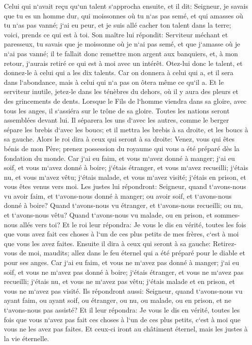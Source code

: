 \verse Celui qui n`avait reçu qu`un talent s`approcha ensuite, et il dit: Seigneur, je savais que tu es un homme dur, qui moissonnes où tu n`as pas semé, et qui amasses où tu n`as pas vanné; 
\verse j`ai eu peur, et je suis allé cacher ton talent dans la terre; voici, prends ce qui est à toi. 
\verse Son maître lui répondit: Serviteur méchant et paresseux, tu savais que je moissonne où je n`ai pas semé, et que j`amasse où je n`ai pas vanné; 
\verse il te fallait donc remettre mon argent aux banquiers, et, à mon retour, j`aurais retiré ce qui est à moi avec un intérêt. 
\verse Otez-lui donc le talent, et donnez-le à celui qui a les dix talents. 
\verse Car on donnera à celui qui a, et il sera dans l`abondance, mais à celui qui n`a pas on ôtera même ce qu`il a. 
\verse Et le serviteur inutile, jetez-le dans les ténèbres du dehors, où il y aura des pleurs et des grincements de dents. 
\verse Lorsque le Fils de l`homme viendra dans sa gloire, avec tous les anges, il s`assiéra sur le trône de sa gloire. 
\verse Toutes les nations seront assemblées devant lui. Il séparera les uns d`avec les autres, comme le berger sépare les brebis d`avec les boucs; 
\verse et il mettra les brebis à sa droite, et les boucs à sa gauche. 
\verse Alors le roi dira à ceux qui seront à sa droite: Venez, vous qui êtes bénis de mon Père; prenez possession du royaume qui vous a été préparé dès la fondation du monde. 
\verse Car j`ai eu faim, et vous m`avez donné à manger; j`ai eu soif, et vous m`avez donné à boire; j`étais étranger, et vous m`avez recueilli; 
\verse j`étais nu, et vous m`avez vêtu; j`étais malade, et vous m`avez visité; j`étais en prison, et vous êtes venus vers moi. 
\verse Les justes lui répondront: Seigneur, quand t`avons-nous vu avoir faim, et t`avons-nous donné à manger; ou avoir soif, et t`avons-nous donné à boire? 
\verse Quand t`avons-nous vu étranger, et t`avons-nous recueilli; ou nu, et t`avons-nous vêtu? 
\verse Quand t`avons-nous vu malade, ou en prison, et sommes-nous allés vers toi? 
\verse Et le roi leur répondra: Je vous le dis en vérité, toutes les fois que vous avez fait ces choses à l`un de ces plus petits de mes frères, c`est à moi que vous les avez faites. 
\verse Ensuite il dira à ceux qui seront à sa gauche: Retirez-vous de moi, maudits; allez dans le feu éternel qui a été préparé pour le diable et pour ses anges. 
\verse Car j`ai eu faim, et vous ne m`avez pas donné à manger; j`ai eu soif, et vous ne m`avez pas donné à boire; 
\verse j`étais étranger, et vous ne m`avez pas recueilli; j`étais nu, et vous ne m`avez pas vêtu; j`étais malade et en prison, et vous ne m`avez pas visité. 
\verse Ils répondront aussi: Seigneur, quand t`avons-nous vu ayant faim, ou ayant soif, ou étranger, ou nu, ou malade, ou en prison, et ne t`avons-nous pas assisté? 
\verse Et il leur répondra: Je vous le dis en vérité, toutes les fois que vous n`avez pas fait ces choses à l`un de ces plus petits, c`est à moi que vous ne les avez pas faites. 
\verse Et ceux-ci iront au châtiment éternel, mais les justes à la vie éternelle. 

